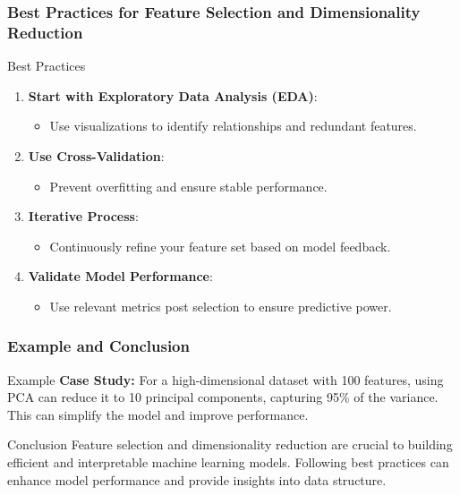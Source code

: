 \documentclass{beamer}
\begin{document}
\begin{frame}[fragile]
    \frametitle{Best Practices for Feature Selection and Dimensionality Reduction}
    \begin{block}{Best Practices}
        \begin{enumerate}
            \item \textbf{Start with Exploratory Data Analysis (EDA)}:
            \begin{itemize}
                \item Use visualizations to identify relationships and redundant features.
            \end{itemize}
            
            \item \textbf{Use Cross-Validation}:
            \begin{itemize}
                \item Prevent overfitting and ensure stable performance.
            \end{itemize}
            
            \item \textbf{Iterative Process}:
            \begin{itemize}
                \item Continuously refine your feature set based on model feedback.
            \end{itemize}
            
            \item \textbf{Validate Model Performance}:
            \begin{itemize}
                \item Use relevant metrics post selection to ensure predictive power.
            \end{itemize}
        \end{enumerate}
    \end{block}
\end{frame}

\begin{frame}[fragile]
    \frametitle{Example and Conclusion}
    \begin{block}{Example}
        \textbf{Case Study:} For a high-dimensional dataset with 100 features, using PCA can reduce it to 10 principal components, capturing 95\% of the variance. This can simplify the model and improve performance.
    \end{block}

    \begin{block}{Conclusion}
        Feature selection and dimensionality reduction are crucial to building efficient and interpretable machine learning models. Following best practices can enhance model performance and provide insights into data structure.
    \end{block}
\end{frame}
\end{document}
